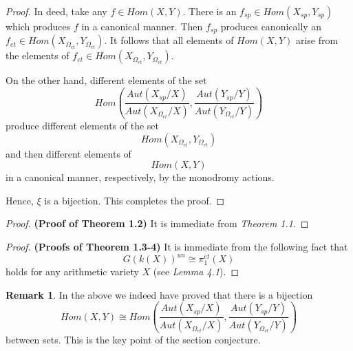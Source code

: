 \documentclass[12pt,twoside,reqno]{amsart}
\theoremstyle{definition}
\newtheorem{remark}[theorem]{Remark}
\numberwithin{equation}{section}
\begin{document}
\begin{proof}
 In deed, take any $f\in Hom(X,Y)$. There is an $f_{sp}\in Hom(X_{sp},Y_{sp})$ which produces $f$ in a canonical manner. Then $f_{sp}$ produces canonically an $f_{et}\in Hom(X_{\Omega_{et}}, Y_{\Omega_{et}})$. It follows that all elements of $Hom(X,Y)$ arise from the elements of $f_{et}\in Hom(X_{\Omega_{et}}, Y_{\Omega_{et}})$.

 On the other hand, different elements of the set $$Hom(\frac{Aut(X_{sp}/X)}{Aut(X_{\Omega _{et}}/X)},\frac{Aut(Y_{sp}/Y)}{Aut(Y_{\Omega _{et}}/Y)})$$ produce different elements of the set $$Hom(X_{\Omega_{et}}, Y_{\Omega_{et}})$$ and then different elements of $$Hom(X,Y)$$ in a canonical manner, respectively, by the monodromy actions.

Hence, $\xi$ is a bijection.
This completes the proof.
\end{proof}

\begin{proof}
\textbf{(Proof of Theorem 1.2)}
It is immediate from  \emph{Theorem 1.1}.
\end{proof}

\begin{proof}
\textbf{(Proofs of Theorem 1.3-4)}
It is immediate from  the following fact that
$$G(k(X))^{un}\cong \pi^{et}_{1}(X)$$ holds for any arithmetic variety $X$ (see \emph{Lemma 4.1}).
\end{proof}

\begin{remark}
In the above we indeed have proved that there is a bijection $$Hom(X,Y) \cong Hom(\frac{Aut(X_{sp}/X)}{Aut(X_{\Omega _{et}}/X)},\frac{Aut(Y_{sp}/Y)}{Aut(Y_{\Omega _{et}}/Y)})$$ between sets. This is the key point of the section conjecture.
\end{remark}

\newpage
\end{document}
